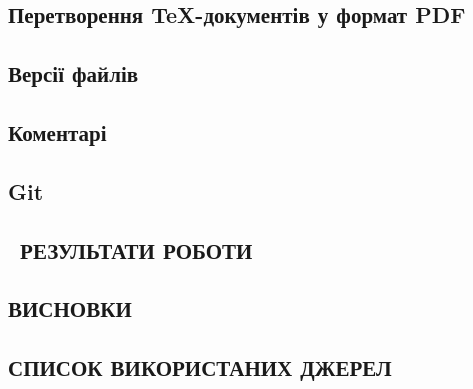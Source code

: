 \documentclass[a4paper,14pt]{extarticle}
\numberwithin{figure}{section}
\begin{document}
    \newpage
    \subsection{\large Перетворення TeX-документів у формат PDF}

    \newpage
    \subsection{\large Версії файлів}
    
    \newpage
    \subsection{\large Коментарі}

    \newpage
    \subsection{\large Git}
    
    \newpage
    \begin{center}
        \section{\large \ РЕЗУЛЬТАТИ РОБОТИ}
    \end{center}

    
    \newpage
    \begin{center}
         \section*{\large ВИСНОВКИ}
    \end{center}
    
    \newpage
    \begin{center}
          \section*{\large СПИСОК ВИКОРИСТАНИХ ДЖЕРЕЛ}  
    \end{center}
    
\end{document}
